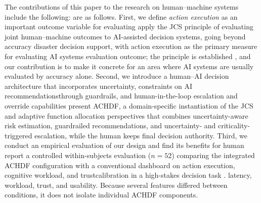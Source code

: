 \documentclass[journal]{IEEEtran}
\theoremstyle{plain}
\theoremstyle{definition}
\providecommand{\DIFaddtex}[1]{{\protect\color{blue} \sf #1}} %
\providecommand{\DIFdeltex}[1]{{\protect\color{red} \scriptsize #1}} %
\providecommand{\DIFaddbegin}{} %
\providecommand{\DIFaddend}{} %
\providecommand{\DIFdelbegin}{} %
\providecommand{\DIFdelend}{} %
\providecommand{\DIFadd}[1]{\texorpdfstring{\DIFaddtex{#1}}{#1}} %
\providecommand{\DIFdel}[1]{\texorpdfstring{\DIFdeltex{#1}}{}} %
\newcommand{\DIFscaledelfig}{0.5}
\newlength{\DIFdelgraphicswidth} %
\newlength{\DIFdelgraphicsheight} %
\newcommand{\DIFaddincludegraphics}[2][]{{\color{blue}\fbox{\DIFOincludegraphics[#1]{#2}}}} %
\newcommand{\DIFdelincludegraphics}[2][]{%
\sbox{\DIFdelgraphicsbox}{\DIFOincludegraphics[#1]{#2}}%
\settoboxwidth{\DIFdelgraphicswidth}{\DIFdelgraphicsbox} %
\settoboxtotalheight{\DIFdelgraphicsheight}{\DIFdelgraphicsbox} %
\scalebox{\DIFscaledelfig}{%
\parbox[b]{\DIFdelgraphicswidth}{\usebox{\DIFdelgraphicsbox}\\[-\baselineskip] \rule{\DIFdelgraphicswidth}{0em}}\llap{\resizebox{\DIFdelgraphicswidth}{\DIFdelgraphicsheight}{%
\setlength{\unitlength}{\DIFdelgraphicswidth}%
\begin{picture}(1,1)%
\thicklines\linethickness{2pt} %
{\color[rgb]{1,0,0}\put(0,0){\framebox(1,1){}}}%
{\color[rgb]{1,0,0}\put(0,0){\line( 1,1){1}}}%
{\color[rgb]{1,0,0}\put(0,1){\line(1,-1){1}}}%
\end{picture}%
}\hspace*{3pt}}} %
} %
\DeclareRobustCommand{\DIFaddbegin}{\DIFOaddbegin \let\includegraphics\DIFaddincludegraphics} %
\DeclareRobustCommand{\DIFaddend}{\DIFOaddend \let\includegraphics\DIFOincludegraphics} %
\DeclareRobustCommand{\DIFdelbegin}{\DIFOdelbegin \let\includegraphics\DIFdelincludegraphics} %
\DeclareRobustCommand{\DIFdelend}{\DIFOaddend \let\includegraphics\DIFOincludegraphics} %
\begin{document}
\DIFadd{The }\DIFaddend contributions of this paper \DIFdelbegin \DIFdel{to the research on human--machine systems include the following: }\DIFdelend \DIFaddbegin \DIFadd{are as follows. }\DIFaddend First, we \DIFdelbegin \DIFdel{define \emph{action execution} as an important outcome variable for evaluating }\DIFdelend \DIFaddbegin \DIFadd{apply the JCS principle of evaluating joint human--machine outcomes to }\DIFaddend AI-assisted \DIFdelbegin \DIFdel{decision systems, going beyond accuracy }\DIFdelend \DIFaddbegin \DIFadd{disaster decision support, with action execution }\DIFaddend as the primary \DIFdelbegin \DIFdel{measure for evaluating AI systems \cite{Lai2023FAccT,Yang2022THMSReview}}\DIFdelend \DIFaddbegin \DIFadd{evaluation outcome; the principle is established \cite{Hollnagel2005JCS,Woods2006JCS}, and our contribution is to make it concrete for an area where AI systems are usually evaluated by accuracy alone}\DIFaddend . Second, we \DIFdelbegin \DIFdel{introduce a human--AI decision architecture that incorporates uncertainty, constraints on AI recommendationsthrough guardrails, and human-in-the-loop escalation and override capabilities \cite{Assaad2023TAS,Bach2024Access}}\DIFdelend \DIFaddbegin \DIFadd{present ACHDF, a domain-specific instantiation of the JCS and adaptive function allocation perspectives that combines uncertainty-aware risk estimation, guardrailed recommendations, and uncertainty- and criticality-triggered escalation, while the human keeps final decision authority}\DIFaddend . Third, we \DIFdelbegin \DIFdel{conduct an empirical evaluation of our design and find its benefits for human }\DIFdelend \DIFaddbegin \DIFadd{report a controlled within-subjects evaluation ($n=52$) comparing the integrated ACHDF configuration with a conventional dashboard on }\DIFaddend action execution, \DIFdelbegin \DIFdel{cognitive workload, and trustcalibration in a high-stakes decision task \cite{Bach2024Access,PerezCerrolaza2024CSUR}. }\DIFdelend \DIFaddbegin \DIFadd{latency, workload, trust, and usability. Because several features differed between conditions, it does not isolate individual ACHDF components.
}\DIFaddend 
\end{document}
